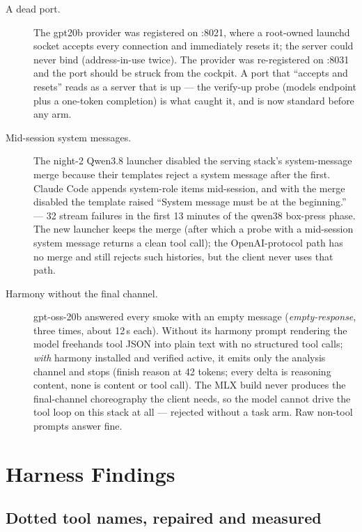 \begin{description}
	\item[A dead port.] The gpt20b provider was registered on :8021, where a root-owned launchd socket accepts
	every connection and immediately resets it; the server could never bind (address-in-use twice). The provider
	was re-registered on :8031 and the port should be struck from the cockpit. A port that ``accepts and resets''
	reads as a server that is up --- the verify-up probe (models endpoint plus a one-token completion) is what
	caught it, and is now standard before any arm.
	\item[Mid-session system messages.] The night-2 Qwen3.8 launcher disabled the serving stack's system-message
	merge because their templates reject a system message after the first. Claude Code appends system-role items
	mid-session, and with the merge disabled the template raised ``System message must be at the beginning.'' ---
	32 stream failures in the first 13 minutes of the qwen38 box-press phase. The new launcher keeps the merge
	(after which a probe with a mid-session system message returns a clean tool call); the OpenAI-protocol path
	has no merge and still rejects such histories, but the client never uses that path.
	\item[Harmony without the final channel.] gpt-oss-20b answered every smoke with an empty message
	(\emph{empty-response}, three times, about 12\,s each). Without its harmony prompt rendering the model freehands
	tool JSON into plain text with no structured tool calls; \emph{with} harmony installed and verified active, it
	emits only the analysis channel and stops (finish reason  at 42 tokens; every delta is reasoning
	content, none is content or tool call). The MLX build never produces the final-channel choreography the client
	needs, so the model cannot drive the tool loop on this stack at all --- rejected without a task arm. Raw
	non-tool prompts answer fine.
\end{description}

\section{Harness Findings}\label{sec:harness}

\subsection{Dotted tool names, repaired and measured}\label{sec:repair}

